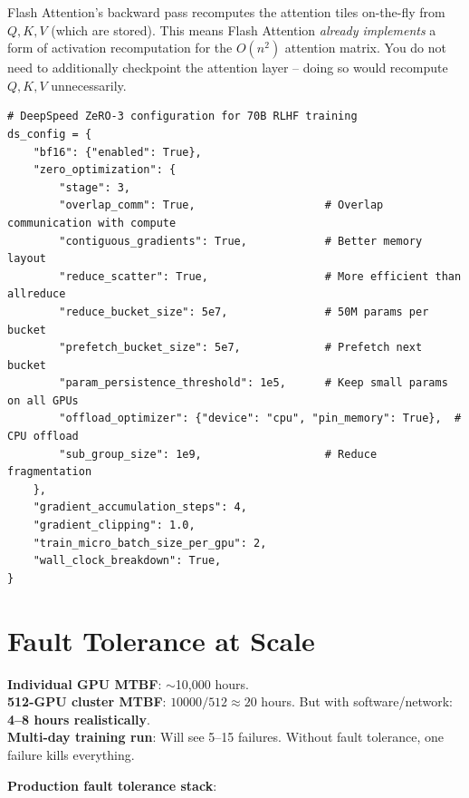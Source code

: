 \begin{warningbox}
Flash Attention’s backward pass recomputes the attention tiles on-the-fly from $Q, K, V$ (which are stored). This means Flash Attention \emph{already implements} a form of activation recomputation for the $O(n^2)$ attention matrix. You do not need to additionally checkpoint the attention layer -- doing so would recompute $Q, K, V$ unnecessarily.
\end{warningbox}

\begin{lstlisting}[style=pythonstyle]
# DeepSpeed ZeRO-3 configuration for 70B RLHF training
ds_config = {
    "bf16": {"enabled": True},
    "zero_optimization": {
        "stage": 3,
        "overlap_comm": True,                    # Overlap communication with compute
        "contiguous_gradients": True,            # Better memory layout
        "reduce_scatter": True,                  # More efficient than allreduce
        "reduce_bucket_size": 5e7,               # 50M params per bucket
        "prefetch_bucket_size": 5e7,             # Prefetch next bucket
        "param_persistence_threshold": 1e5,      # Keep small params on all GPUs
        "offload_optimizer": {"device": "cpu", "pin_memory": True},  # CPU offload
        "sub_group_size": 1e9,                   # Reduce fragmentation
    },
    "gradient_accumulation_steps": 4,
    "gradient_clipping": 1.0,
    "train_micro_batch_size_per_gpu": 2,
    "wall_clock_breakdown": True,
}
\end{lstlisting}

\section{Fault Tolerance at Scale}
\label{fault-tolerance-at-scale}

\begin{warningbox}
\textbf{Individual GPU MTBF}: $\sim$10,000 hours.\\
\textbf{512-GPU cluster MTBF}: $10000/512 \approx 20$ hours. But with software/network: \textbf{4--8 hours realistically}.\\
\textbf{Multi-day training run}: Will see 5--15 failures. Without fault tolerance, one failure kills everything.
\end{warningbox}

\textbf{Production fault tolerance stack}:

